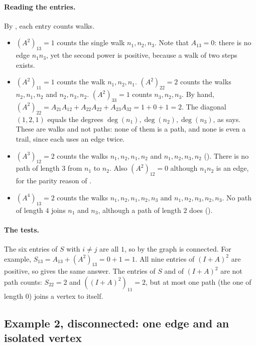 \paragraph{Reading the entries.} By , each entry counts walks.
\begin{itemize}
\item $(A^2)_{13}=1$ counts the single walk $n_1,n_2,n_3$. Note that $A_{13}=0$: there is no edge $n_1n_3$, yet the second power is positive, because a walk of two steps exists.
\item $(A^2)_{11}=1$ counts the walk $n_1,n_2,n_1$. $(A^2)_{22}=2$ counts the walks $n_2,n_1,n_2$ and $n_2,n_3,n_2$. $(A^2)_{33}=1$ counts $n_3,n_2,n_3$. By hand, $(A^2)_{22}=A_{21}A_{12}+A_{22}A_{22}+A_{23}A_{32}=1+0+1=2$. The diagonal $(1,2,1)$ equals the degrees $\deg(n_1),\deg(n_2),\deg(n_3)$, as  says. These are walks and not paths: none of them is a path, and none is even a trail, since each uses an edge twice.
\item $(A^3)_{12}=2$ counts the walks $n_1,n_2,n_1,n_2$ and $n_1,n_2,n_3,n_2$ (). There is no path of length $3$ from $n_1$ to $n_2$. Also $(A^2)_{12}=0$ although $n_1n_2$ is an edge, for the parity reason of .
\item $(A^4)_{13}=2$ counts the walks $n_1,n_2,n_1,n_2,n_3$ and $n_1,n_2,n_3,n_2,n_3$. No path of length $4$ joins $n_1$ and $n_3$, although a path of length $2$ does ().
\end{itemize}

\paragraph{The tests.} The six entries of $S$ with $i\ne j$ are all $1$, so by  the graph is connected. For example, $S_{13}=A_{13}+(A^2)_{13}=0+1=1$. All nine entries of $(I+A)^2$ are positive, so  gives the same answer. The entries of $S$ and of $(I+A)^2$ are not path counts: $S_{22}=2$ and $((I+A)^2)_{11}=2$, but at most one path (the one of length $0$) joins a vertex to itself.

\subsection{Example 2, disconnected: one edge and an isolated vertex}


